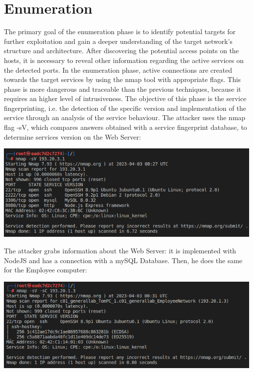 \documentclass[a4paper, 12pt, oneside]{extbook}
\begin{document}
\chapter{Enumeration}
The primary goal of the enumeration phase is to identify potential targets for further exploitation and gain a deeper understanding of the target network's structure and architecture.
After discovering the potential access points on the hosts, it is necessary to reveal other information regarding the active services on the detected ports. In the enumeration phase,
active connections are created towards the target services by using the nmap tool with appropriate flags. This phase is more dangerous and traceable than the previous techniques, because it requires an higher level of intrusiveness.
\newline The objective of this phase is the service fingerprinting, i.e. the detection of the specific version and implementation of the service through an analysis of the service behaviour. 
\newline The attacker uses the nmap flag -sV, which compares answers obtained with a service fingerprint database, to determine services version on the Web Server:
\begin{center}
\includegraphics[scale=0.76]{../Image/enumeration_company_sv.PNG}
\end{center}
The attacker grabs information about the Web Server: it is implemented with NodeJS and has a connection with a mySQL Database. Then, he does the same for the Employee computer:
\begin{center}
\includegraphics[scale=0.76]{../Image/enumeration_tom_sv.PNG}
\end{center}
\end{document}
